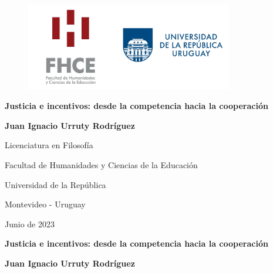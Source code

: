 \documentclass[11pt]{article}
\begin{document}
\begin{titlepage}
\begin{center}


\begin{figure}[H]
\centering
    \includegraphics[width =0.81\textwidth]{fhuce2.jpg}
    \end{figure}
    
\vspace{9mm}

\huge{\textbf{Justicia e incentivos: desde la competencia hacia la cooperación}}


\vspace{18mm}

\LARGE 
\textbf{Juan Ignacio Urruty Rodríguez}

\vspace{70mm}


\large{

Licenciatura en Filosofía

Facultad de Humanidades y Ciencias de la Educación

Universidad de la República}

\vspace{10mm}

Montevideo - Uruguay

Junio de 2023



\end{center}
\end{titlepage}

\begin{center}

\thispagestyle{empty}



\huge{\textbf{Justicia e incentivos: desde la competencia hacia la cooperación}}


\vspace{18mm}

\LARGE{ 
\textbf{Juan Ignacio Urruty Rodríguez}}
\end{center}
\end{document}
